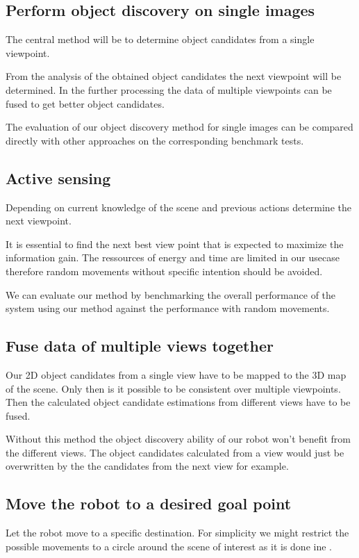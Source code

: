 \documentclass[a4paper,11pt,english]{article}
\begin{document}
\subsection{Perform object discovery on single images}
The central method will be to determine object candidates from a single viewpoint.

From the analysis of the obtained object candidates the next viewpoint will be determined.
In the further processing the data of multiple viewpoints can be fused to get better object candidates.

The evaluation of our object discovery method for single images can be compared directly with other approaches on the corresponding benchmark tests.

\subsection{Active sensing}
Depending on current knowledge of the scene and previous actions determine the next viewpoint.

It is essential to find the next best view point that is expected to maximize the information gain.
The ressources of energy and time are limited in our usecase therefore random movements without specific intention should be avoided.

We can evaluate our method by benchmarking the overall performance of the system using our method against the performance with random movements.

\subsection{Fuse data of multiple views together}
Our 2D object candidates from a single view have to be mapped to the 3D map of the scene.
Only then is it possible to be consistent over multiple viewpoints.
Then the calculated object candidate estimations from different views have to be fused.

Without this method the object discovery ability of our robot won't benefit from the different views.
The object candidates calculated from a view would just be overwritten by the the candidates from the next view for example.

\subsection{Move the robot to a desired goal point}
Let the robot move to a specific destination.
For simplicity we might restrict the possible movements to a circle around the scene of interest as it is done ine \cite{atanasov2014nonmyopic}.
\end{document}
